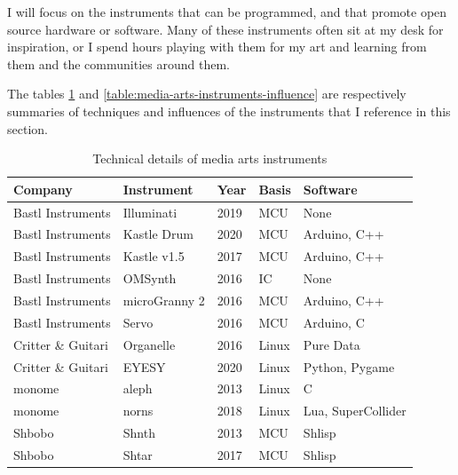 I will focus on the instruments that can be programmed, and that promote open source hardware or software. Many of these instruments often sit at my desk for inspiration, or I spend hours playing with them for my art and learning from them and the communities around them.

The tables \ref{table:media-arts-instruments-technical} and \ref{table:media-arts-instruments-influence} are respectively summaries of techniques and influences of the instruments that I reference in this section.

\begin{table}[ht]
    \centering
    \begin{tabular}{ | l |  l | l | l | l |}
        \hline
        Company             & Instrument    & Year  & Basis & Software            \\
        \hline
        Bastl Instruments   & Illuminati    & 2019  & MCU       & None                \\
        Bastl Instruments   & Kastle Drum   & 2020  & MCU       & Arduino, C++        \\
        Bastl Instruments   & Kastle v1.5   & 2017  & MCU       & Arduino, C++        \\
        Bastl Instruments   & OMSynth       & 2016  & IC        & None                \\
        Bastl Instruments   & microGranny 2 & 2016  & MCU       & Arduino, C++        \\
        Bastl Instruments   & Servo         & 2016  & MCU       & Arduino, C          \\
        Critter \& Guitari  & Organelle     & 2016  & Linux     & Pure Data           \\
        Critter \& Guitari  & EYESY         & 2020  & Linux     & Python, Pygame      \\
        monome              & aleph         & 2013  & Linux     & C                   \\
        monome              & norns         & 2018  & Linux     & Lua, SuperCollider  \\
        Shbobo              & Shnth         & 2013  & MCU       & Shlisp              \\
        Shbobo              & Shtar         & 2017  & MCU       & Shlisp              \\
        \hline
    \end{tabular}
    \caption{Technical details of media arts instruments}
    \label{table:media-arts-instruments-technical}
\end{table}{}

